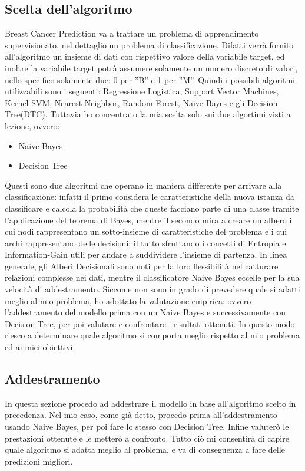 \documentclass{article}
\begin{document}
\subsection{Scelta dell'algoritmo}
Breast Cancer Prediction va a trattare un problema di apprendimento supervisionato, nel dettaglio un problema di classificazione. Difatti verrà fornito all’algoritmo un insieme di dati con rispettivo valore della variabile target, ed inoltre la variabile target potrà assumere solamente un numero discreto di valori, nello specifico solamente due: 0 per ”B” e 1 per ”M”. Quindi i possibili algoritmi utilizzabili sono i seguenti: Regressione Logistica, Support Vector Machines, Kernel SVM, Nearest Neighbor, Random Forest, Naive Bayes e gli Decision Tree(DTC).
Tuttavia ho concentrato la mia scelta solo sui due algortimi visti a lezione, ovvero:
\begin{itemize}
    \item Naive Bayes
    \item Decision Tree
\end{itemize}
Questi sono due algoritmi che operano in maniera differente per arrivare alla classificazione: infatti il primo considera le caratteristiche della nuova istanza da classificare e calcola la probabilità che queste facciano parte di una classe tramite l’applicazione del teorema di Bayes, mentre il secondo mira a creare un albero i cui nodi rappresentano un sotto-insieme di caratteristiche del problema e i cui archi rappresentano delle decisioni; il tutto sfruttando i concetti di Entropia e Information-Gain utili per andare a suddividere l’insieme di partenza.
In linea generale, gli Alberi Decisionali sono noti per la loro flessibilità nel catturare relazioni complesse nei dati, mentre il classificatore Naive Bayes eccelle per la sua velocità di addestramento. Siccome non sono in grado di prevedere quale si adatti meglio al mio problema, ho adottato la valutazione empirica: ovvero l’addestramento del modello prima con un Naive Bayes e successivamente con Decision Tree, per poi valutare e confrontare i risultati ottenuti.
In questo modo riesco a determinare quale algoritmo si comporta meglio rispetto al mio problema ed ai miei obiettivi.

\subsection{Addestramento}
In questa sezione procedo ad addestrare il modello in base all’algoritmo scelto in precedenza. Nel mio caso, come già detto, procedo prima all’addestramento usando Naive Bayes, per poi fare lo stesso con Decision Tree. Infine valuterò le prestazioni ottenute e le metterò a confronto. Tutto ciò mi consentirà di capire quale algoritmo si adatta meglio al problema, e va di conseguenza a fare delle predizioni
migliori.
\end{document}
